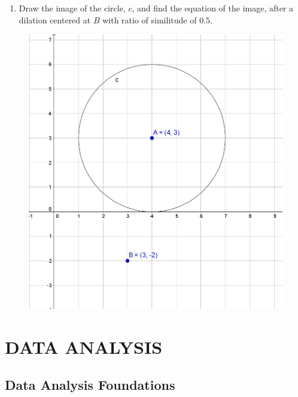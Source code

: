 \documentclass[
]{book}
\providecommand{\tightlist}{%
  \setlength{\itemsep}{0pt}\setlength{\parskip}{0pt}}
\theoremstyle{definition}
\theoremstyle{definition}
\theoremstyle{definition}
\theoremstyle{definition}
\theoremstyle{remark}
\begin{document}
\begin{enumerate}
\def\labelenumi{\arabic{enumi}.}
\tightlist
\item
  Draw the image of the circle, \(c\), and find the equation of the image, after a dilation centered at \(B\) with ratio of similitude of \(0.5\).
\end{enumerate}

\begin{figure}

{\centering \includegraphics[width=0.7\linewidth]{images/circledilation} 

}

\end{figure}

\hypertarget{part-data-analysis}{%
\part{DATA ANALYSIS}\label{part-data-analysis}}

\hypertarget{ch:data1}{%
\chapter{Data Analysis Foundations}\label{ch:data1}}
\end{document}
